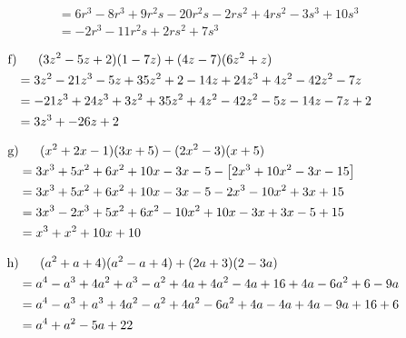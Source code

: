 \begin{exercise}
{\begin{equation*}
\begin{split}
                    &=           6r^3-8r^3+9r^2s-20r^2s-2rs^2+4rs^2-3s^3+10s^3 \\
                    &=           -2r^3-11r^2s+2rs^2+7s^3
        \end{split}
      \end{equation*}
    }%
    \newcommand{\solutionF}[1]
    {%
      \begin{equation*}
        \begin{split}
          \text{f)} &\toprow[#1]{(3z^2-5z+2)(1-7z)+(4z-7)(6z^2+z)}              \\
                    &=           3z^2-21z^3-5z+35z^2+2-14z+24z^3+4z^2-42z^2-7z  \\
                    &=           -21z^3+24z^3+3z^2+35z^2+4z^2-42z^2-5z-14z-7z+2 \\
                    &=           3z^3+-26z+2
        \end{split}
      \end{equation*}
    }%
    \newcommand{\solutionG}[1]
    {%
      \begin{equation*}
        \begin{split}
          \text{g)} &\toprow[#1]{(x^2+2x-1)(3x+5)-(2x^2-3)(x+5)}                       \\
                    &=           3x^3+5x^2+6x^2+10x-3x-5-\left[2x^3+10x^2-3x-15\right] \\
                    &=           3x^3+5x^2+6x^2+10x-3x-5-2x^3-10x^2+3x+15              \\
                    &=           3x^3-2x^3+5x^2+6x^2-10x^2+10x-3x+3x-5+15              \\
                    &=           x^3+x^2+10x+10
        \end{split}
      \end{equation*}
    }%
    \newcommand{\solutionH}[1]
    {%
      \begin{equation*}
        \begin{split}
          \text{h)} &\toprow[#1]{(a^2+a+4)(a^2-a+4)+(2a+3)(2-3a)}                \\
                    &=           a^4-a^3+4a^2+a^3-a^2+4a+4a^2-4a+16+4a-6a^2+6-9a \\
                    &=           a^4-a^3+a^3+4a^2-a^2+4a^2-6a^2+4a-4a+4a-9a+16+6 \\
                    &=           a^4+a^2-5a+22
        \end{split}
      \end{equation*}
    }%
    {\small
      \solutionA{30em}\par
      \solutionB{30em}\par
      \solutionC{30em}\par
      \solutionD{30em}\par
      \solutionE{30em}\par
      \solutionF{30em}\par
      \solutionG{30em}\par
      \solutionH{30em}\par
    }
  \fi
\end{exercise}
